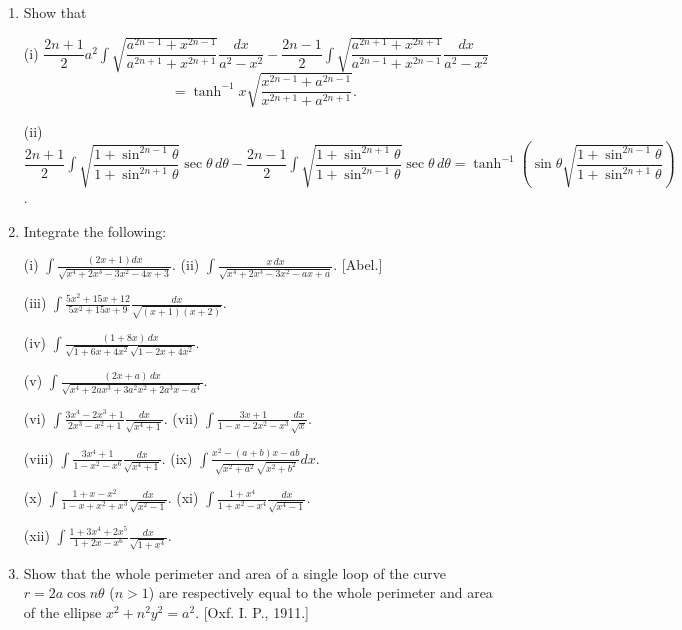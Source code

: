 \documentclass[11pt, a4paper]{article}
\newcommand{\source}[1]{\hfill\textnormal{[#1]}}
\begin{document}
\begin{enumerate}[leftmargin=2em]
(3) $\displaystyle\int\frac{\sinh2x\,dx}{\sqrt{\cosh^2x+1}\sqrt{\cosh^2x+2}}=2\tanh^{-1}\sqrt{\frac{\cosh^2x+1}{\cosh^2x+2}}$.

\item Show that

(i) $\dfrac{2n+1}{2}a^2\displaystyle\int\sqrt{\dfrac{a^{2n-1}+x^{2n-1}}{a^{2n+1}+x^{2n+1}}}\dfrac{dx}{a^2-x^2}-\dfrac{2n-1}{2}\displaystyle\int\sqrt{\dfrac{a^{2n+1}+x^{2n+1}}{a^{2n-1}+x^{2n-1}}}\dfrac{dx}{a^2-x^2}$
\[
=\tanh^{-1}x\sqrt{\frac{x^{2n-1}+a^{2n-1}}{x^{2n+1}+a^{2n+1}}}.
\]

(ii) $\dfrac{2n+1}{2}\displaystyle\int\sqrt{\dfrac{1+\sin^{2n-1}\theta}{1+\sin^{2n+1}\theta}}\sec\theta\,d\theta-\dfrac{2n-1}{2}\displaystyle\int\sqrt{\dfrac{1+\sin^{2n+1}\theta}{1+\sin^{2n-1}\theta}}\sec\theta\,d\theta=\tanh^{-1}\left(\sin\theta\sqrt{\dfrac{1+\sin^{2n-1}\theta}{1+\sin^{2n+1}\theta}}\right)$.

\item Integrate the following:

(i) $\displaystyle\int\frac{(2x+1)dx}{\sqrt{x^4+2x^3-3x^2-4x+3}}$.   (ii) $\displaystyle\int\frac{x\,dx}{\sqrt{x^4+2x^3-3x^2-ax+a}}$. \source{Abel.}

(iii) $\displaystyle\int\frac{5x^2+15x+12}{5x^2+15x+9}\frac{dx}{\sqrt{(x+1)(x+2)}}$.

(iv) $\displaystyle\int\frac{(1+8x)\,dx}{\sqrt{1+6x+4x^2}\sqrt{1-2x+4x^2}}$.

(v) $\displaystyle\int\frac{(2x+a)\,dx}{\sqrt{x^4+2ax^3+3a^2x^2+2a^3x-a^4}}$.

(vi) $\displaystyle\int\frac{3x^4-2x^3+1}{2x^3-x^2+1}\frac{dx}{\sqrt{x^4+1}}$.   (vii) $\displaystyle\int\frac{3x+1}{1-x-2x^2-x^3}\frac{dx}{\sqrt x}$.

(viii) $\displaystyle\int\frac{3x^4+1}{1-x^2-x^6}\frac{dx}{\sqrt{x^4+1}}$.   (ix) $\displaystyle\int\frac{x^2-(a+b)x-ab}{\sqrt{x^2+a^2}\sqrt{x^2+b^2}}dx$.

(x) $\displaystyle\int\frac{1+x-x^2}{1-x+x^2+x^3}\frac{dx}{\sqrt{x^2-1}}$.   (xi) $\displaystyle\int\frac{1+x^4}{1+x^2-x^4}\frac{dx}{\sqrt{x^4-1}}$.

(xii) $\displaystyle\int\frac{1+3x^4+2x^5}{1+2x-x^6}\frac{dx}{\sqrt{1+x^4}}$.

\item Show that the whole perimeter and area of a single loop of the curve $r=2a\cos n\theta$ ($n>1$) are respectively equal to the whole perimeter and area of the ellipse $x^2+n^2y^2=a^2$. \source{Oxf. I. P., 1911.}


\end{enumerate}
\end{document}
